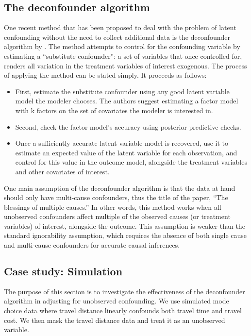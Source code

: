 \subsection{The deconfounder algorithm}
\label{sec:deconfounder-algo}



One recent method that has been proposed to deal with the problem of latent
confounding without the need to collect additional data is the deconfounder
algorithm by \citet{wang_2019_blessings}. The method attempts to control for the
confounding variable by estimating a ``substitute confounder'': a set of variables
that once controlled for, renders all variation in the treatment variables of
interest exogenous. The process of applying the method can be stated simply.
It proceeds as follows:
\begin{itemize}
	\item First, estimate the substitute confounder using any good latent variable
	model the modeler chooses. The authors suggest estimating a factor model
	with k factors on the set of covariates the modeler is interested in.
	\item Second, check the factor model's accuracy using posterior predictive
	checks.
	\item Once a sufficiently accurate latent variable model is recovered, use it
	to estimate an expected value of the latent variable for each observation,
	and control for this value in the outcome model, alongside the treatment
	variables and other covariates of interest.
\end{itemize}



One main assumption of the deconfounder algorithm is that the data at hand
should only have multi-cause confounders, thus the title of the paper, ``The
blessings of multiple causes.'' In other words, this method works when all
unobserved confounders affect multiple of the observed causes (or treatment
variables) of interest, alongside the outcome. This assumption is weaker than
the standard ignorability assumption, which requires the absence of both
single cause and multi-cause confounders for accurate causal inferences.



\subsection{Case study: Simulation}
\label{sec:deconfounder-simulation}

The purpose of this section is to investigate the effectiveness of the
deconfounder algorithm \citep{wang_2019_blessings} in adjusting for unobserved
confounding. We use simulated mode choice data where travel distance
linearly confounds both travel time and travel cost. We then mask the travel
distance data and treat it as an unobserved variable.


